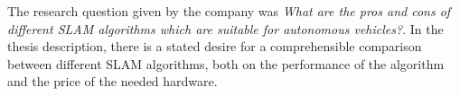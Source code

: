 The research question given by the company was \textit{What are the pros and 
    cons of different SLAM algorithms which are suitable for autonomous vehicles?}.
In the thesis description, there is a stated desire for a comprehensible 
comparison between different SLAM algorithms, both on the performance of the 
algorithm and the price of the needed hardware. 
